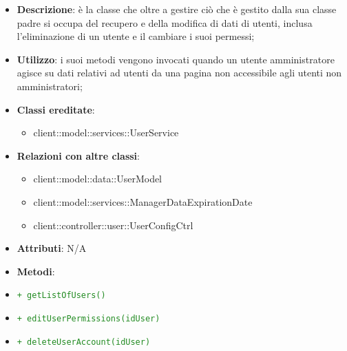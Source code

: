			\begin{itemize}
				\item \textbf{Descrizione}: è la classe che oltre a gestire ciò che è gestito dalla sua classe padre si occupa del recupero e della modifica di dati di utenti, inclusa l'eliminazione di un utente e il cambiare i suoi permessi;
				\item \textbf{Utilizzo}: i suoi metodi vengono invocati quando un utente amministratore agisce su dati relativi ad utenti da una pagina non accessibile agli utenti non amministratori;
				\item \textbf{Classi ereditate}:
					\begin{itemize}
						\item client::model::services::UserService
					\end{itemize}
				\item \textbf{Relazioni con altre classi}:
					\begin{itemize}
						\item client::model::data::UserModel
						\item client::model::services::ManagerDataExpirationDate
						\item client::controller::user::UserConfigCtrl
					\end{itemize}
				\item \textbf{Attributi}: N/A
				\item \textbf{Metodi}:
				\item \textcolor{forestgreen}{\texttt{+ getListOfUsers()}}
					\item \textcolor{forestgreen}{\texttt{+ editUserPermissions(idUser)}}
					\item \textcolor{forestgreen}{\texttt{+ deleteUserAccount(idUser)}}
				\end{itemize}

